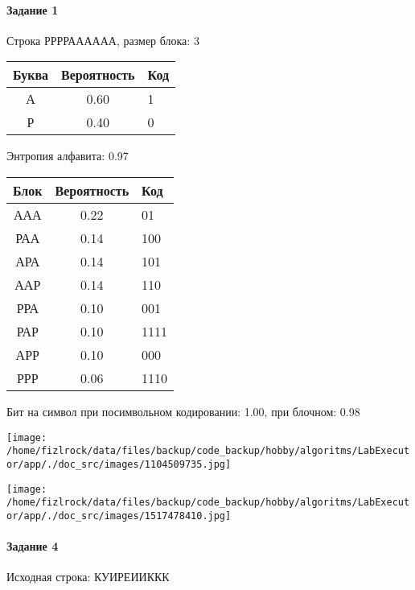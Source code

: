 \documentclass[a4paper, 12pt]{article}
\begin{document}
\paragraph{Задание 1}

Строка РРРРАААААА, размер блока: 3
\begin{center}
 \begin{tabular}{ |c|c|l| } 
  \hline
     Буква & Вероятность & Код\\ \hline
А & 0.60 & 1\\\hline
Р & 0.40 & 0
\\ \hline \end{tabular}
\end{center}
Энтропия алфавита: 0.97
\begin{center}
 \begin{tabular}{ |c|c|l| } 
  \hline
     Блок & Вероятность & Код\\ \hline
ААА & 0.22 & 01\\\hline
РАА & 0.14 & 100\\\hline
АРА & 0.14 & 101\\\hline
ААР & 0.14 & 110\\\hline
РРА & 0.10 & 001\\\hline
РАР & 0.10 & 1111\\\hline
АРР & 0.10 & 000\\\hline
РРР & 0.06 & 1110
\\ \hline \end{tabular}
\end{center}
Бит на символ при посимвольном кодировании: 1.00, при блочном: 0.98

\texttt{[image: /home/fizlrock/data/files/backup/code\_backup/hobby/algoritms/LabExecutor/app/./doc\_src/images/1104509735.jpg]}

\texttt{[image: /home/fizlrock/data/files/backup/code\_backup/hobby/algoritms/LabExecutor/app/./doc\_src/images/1517478410.jpg]}
\paragraph{Задание 4}


Исходная строка: КУИРЕИИККК
\end{document}
